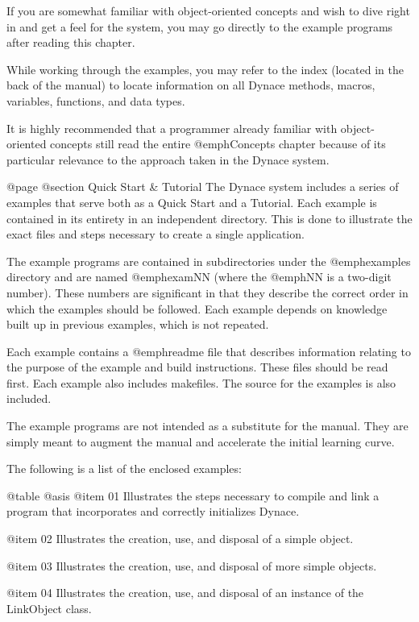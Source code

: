 If you are somewhat familiar with object-oriented concepts and wish
to dive right in and get a feel for the system, you may go directly
to the example programs after reading this chapter.

While working through the examples, you may refer to the index (located
in the back of the manual) to locate information on all Dynace methods,
macros, variables, functions, and data types.


It is highly recommended that a programmer already familiar with object-oriented 
concepts still read the entire @emph{Concepts} chapter because
of its particular relevance to the approach taken in the Dynace system.







@page
@section Quick Start & Tutorial
The Dynace system includes a series of examples that serve both as a
Quick Start and a Tutorial.  Each example is contained in its entirety
in an independent directory.  This is done to illustrate the
exact files and steps necessary to create a single application.

The example programs are contained in subdirectories under the
@emph{examples} directory and are named @emph{examNN} (where the
@emph{NN} is a two-digit number).  These numbers are significant in that
they describe the correct order in which the examples should be followed.
Each example depends on knowledge built up in previous examples, which is
not repeated.

Each example contains a @emph{readme} file that describes information
relating to the purpose of the example and build instructions.  These
files should be read first.  Each example also includes makefiles.
The source for the examples is also included.

The example programs are not intended as a substitute for the manual.
They are simply meant to augment the manual and accelerate the initial
learning curve.

The following is a list of the enclosed examples:

@table @asis
@item 01
Illustrates the steps necessary to compile and link a program that
incorporates and correctly initializes Dynace.

@item 02
Illustrates the creation, use, and disposal of a simple object.

@item 03
Illustrates the creation, use, and disposal of more simple objects.

@item 04
Illustrates the creation, use, and disposal of an instance of the
LinkObject class.

